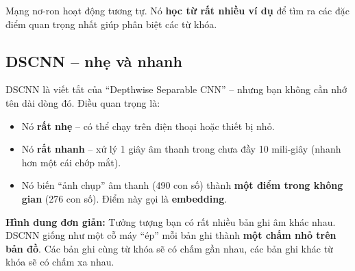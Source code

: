 \documentclass[12pt,a4paper]{article}
\begin{document}
Mạng nơ-ron hoạt động tương tự. Nó \textbf{học từ rất nhiều ví dụ} để tìm ra
các đặc điểm quan trọng nhất giúp phân biệt các từ khóa.

\subsection{DSCNN -- nhẹ và nhanh}

DSCNN là viết tắt của ``Depthwise Separable CNN'' -- nhưng bạn không cần nhớ
tên dài dòng đó. Điều quan trọng là:

\begin{itemize}[leftmargin=1.5cm]
    \item Nó \textbf{rất nhẹ} -- có thể chạy trên điện thoại hoặc thiết bị nhỏ.
    \item Nó \textbf{rất nhanh} -- xử lý 1 giây âm thanh trong chưa đầy 10 mili-giây
          (nhanh hơn một cái chớp mắt).
    \item Nó biến ``ảnh chụp'' âm thanh (490 con số) thành \textbf{một điểm
          trong không gian} (276 con số). Điểm này gọi là \textbf{embedding}.
\end{itemize}

\begin{examplebox}
\textbf{Hình dung đơn giản:} Tưởng tượng bạn có rất nhiều bản ghi âm khác nhau.
DSCNN giống như một cỗ máy ``ép'' mỗi bản ghi thành \textbf{một chấm nhỏ trên bản đồ}.
Các bản ghi cùng từ khóa sẽ có chấm gần nhau, các bản ghi khác từ khóa sẽ có
chấm xa nhau.
\end{examplebox}
\end{document}
